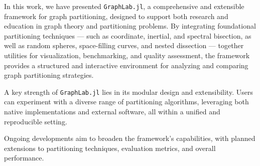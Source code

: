 \documentclass[../paper.tex]{subfiles}
\begin{document}
    In this work, we have presented \texttt{GraphLab.jl}, a comprehensive and extensible framework for graph partitioning,
    designed to support both research and education in graph theory and partitioning problems.
    By integrating foundational partitioning techniques --- such as coordinate, inertial, and spectral
    bisection, as well as random spheres, space-filling curves, and nested
    dissection --- together utilities for visualization, benchmarking, and quality assessment, the framework provides
    a structured and interactive environment for analyzing and comparing graph partitioning strategies.
    
    A key strength of \texttt{GraphLab.jl} lies in its modular design and extensibility. Users can experiment
    with a diverse range of partitioning algorithms, leveraging both native implementations and external software, all within a unified and reproducible setting.
    
    Ongoing developments aim to broaden the framework's capabilities, with planned extensions to partitioning techniques, evaluation metrics, and overall performance.
\end{document}
